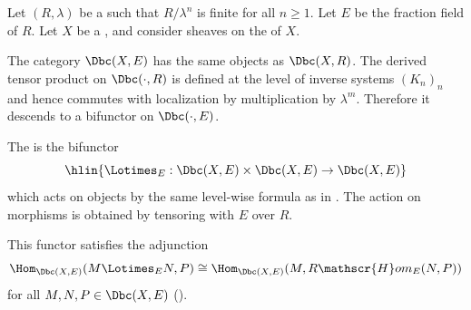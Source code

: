 \begin{definition} \label{definition:derived_tensor_product_on_bdd_constructible_complexes_with_rational_coefficients_on_a_noetherian_scheme}
    Let $(R, \lambda)$ be a   such that $R/\lambda^n$ is finite for all $n \geq 1$. Let $E$ be the fraction field of $R$. Let $X$ be a , and consider sheaves on the  of $X$.

    The category $\Dbc(X, E)$ has the same objects as $\Dbc(X, R)$. The derived tensor product on $\Dbc(\cdot, R)$ is defined at the level of inverse systems $(K_n)_n$ and hence commutes with localization by multiplication by $\lambda^m$. Therefore it descends to a bifunctor on $\Dbc(\cdot, E)$.

    The  is the bifunctor
    $$\hlin{\Lotimes_E : \Dbc(X, E) \times \Dbc(X, E) \to \Dbc(X, E)}$$
    which acts on objects by the same level-wise formula as in . The action on morphisms is obtained by tensoring with $E$ over $R$.

    This functor satisfies the adjunction
    $$\Hom_{\Dbc(X,E)}(M \Lotimes_E N, P) \cong \Hom_{\Dbc(X,E)}(M, R\mathscr{H}om_E(N,P))$$
    for all $M,N,P \in \Dbc(X, E)$ ().
\end{definition}
